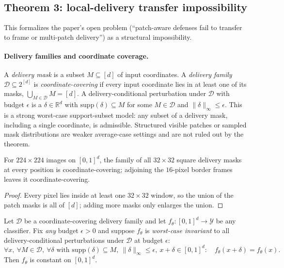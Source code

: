 \subsection{Theorem 3: local-delivery transfer impossibility}
\label{sec:thm3}

This formalizes the paper's open problem (``patch-aware defenses fail to
transfer to frame or multi-patch delivery'') as a structural impossibility.

\paragraph{Delivery families and coordinate coverage.} A \emph{delivery mask}
is a subset $M \subseteq [d]$ of input coordinates. A \emph{delivery family}
$\mathcal{D} \subseteq 2^{[d]}$ is \emph{coordinate-covering} if every input
coordinate lies in at least one of its masks, $\bigcup_{M \in \mathcal{D}} M =
[d]$. A delivery-conditional perturbation under $\mathcal{D}$ with budget
$\epsilon$ is a $\delta \in \mathbb{R}^d$ with $\mathrm{supp}(\delta) \subseteq
M$ for some $M \in \mathcal{D}$ and $\|\delta\|_\infty \leq \epsilon$. This is
a strong worst-case support-subset model: any subset of a delivery mask,
including a single coordinate, is admissible. Structured visible patches or
sampled mask distributions are weaker average-case settings and are not ruled
out by the theorem.

\begin{lemma}
\label{lem:cover}
For $224 \times 224$ images on $[0,1]^d$, the family of all $32\times 32$
square delivery masks at every position is coordinate-covering; adjoining the
$16$-pixel border frames leaves it coordinate-covering.
\end{lemma}

\begin{proof}
Every pixel lies inside at least one $32\times 32$ window, so the union of the
patch masks is all of $[d]$; adding more masks only enlarges the union.
\end{proof}

\begin{theorem}
\label{thm:transfer}
Let $\mathcal{D}$ be a coordinate-covering delivery family and let $f_\theta:
[0,1]^d \to \mathcal{Y}$ be any classifier. Fix \emph{any} budget
$\epsilon > 0$ and suppose $f_\theta$ is \emph{worst-case invariant} to all
delivery-conditional perturbations under $\mathcal{D}$ at budget $\epsilon$:
\begin{equation}
  \forall x,\ \forall M \in \mathcal{D},\ \forall \delta \text{ with }
  \mathrm{supp}(\delta) \subseteq M,\ \|\delta\|_\infty \leq \epsilon,\
  x+\delta \in [0,1]^d : \quad f_\theta(x+\delta) = f_\theta(x).
\end{equation}
Then $f_\theta$ is constant on $[0,1]^d$.
\end{theorem}

